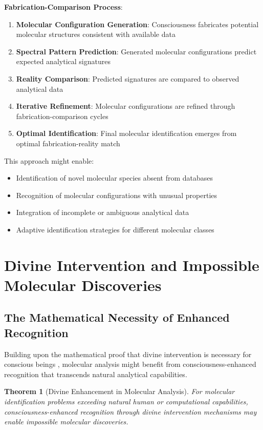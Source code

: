 \documentclass[11pt,a4paper]{article}
\newtheorem{theorem}{Theorem}[section]
\theoremstyle{remark}
\begin{document}
\textbf{Fabrication-Comparison Process}:
\begin{enumerate}
\item \textbf{Molecular Configuration Generation}: Consciousness fabricates potential molecular structures consistent with available data
\item \textbf{Spectral Pattern Prediction}: Generated molecular configurations predict expected analytical signatures
\item \textbf{Reality Comparison}: Predicted signatures are compared to observed analytical data
\item \textbf{Iterative Refinement}: Molecular configurations are refined through fabrication-comparison cycles
\item \textbf{Optimal Identification}: Final molecular identification emerges from optimal fabrication-reality match
\end{enumerate}

This approach might enable:
\begin{itemize}
\item Identification of novel molecular species absent from databases
\item Recognition of molecular configurations with unusual properties
\item Integration of incomplete or ambiguous analytical data
\item Adaptive identification strategies for different molecular classes
\end{itemize}

\section{Divine Intervention and Impossible Molecular Discoveries}

\subsection{The Mathematical Necessity of Enhanced Recognition}

Building upon the mathematical proof that divine intervention is necessary for conscious beings \cite{sachikonye2024divine}, molecular analysis might benefit from consciousness-enhanced recognition that transcends natural analytical capabilities.

\begin{theorem}[Divine Enhancement in Molecular Analysis]
For molecular identification problems exceeding natural human or computational capabilities, consciousness-enhanced recognition through divine intervention mechanisms may enable impossible molecular discoveries.
\end{theorem}
\end{document}
